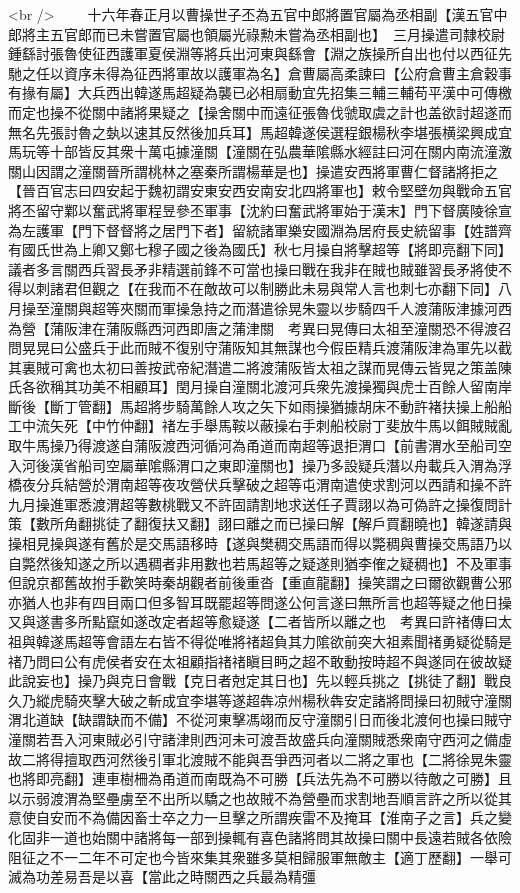 <br />
　　十六年春正月以曹操世子丕為五官中郎將置官屬為丞相副【漢五官中郎將主五官郎而已未嘗置官屬也領屬光祿勲未嘗為丞相副也】　三月操遣司隸校尉鍾繇討張魯使征西護軍夏侯淵等將兵出河東與繇會【淵之族操所自出也付以西征先馳之任以資序未得為征西將軍故以護軍為名】倉曹屬高柔諫曰【公府倉曹主倉穀事有掾有屬】大兵西出韓遂馬超疑為襲已必相扇動宜先招集三輔三輔苟平漢中可傳檄而定也操不從關中諸將果疑之【操舍關中而遠征張魯伐虢取虞之計也盖欲討超遂而無名先張討魯之埶以速其反然後加兵耳】馬超韓遂侯選程銀楊秋李堪張横梁興成宜馬玩等十部皆反其衆十萬屯據潼關【潼關在弘農華隂縣水經註曰河在關内南流潼激關山因謂之潼關晉所謂桃林之塞秦所謂楊華是也】操遣安西將軍曹仁督諸將拒之【晉百官志曰四安起于魏初謂安東安西安南安北四將軍也】敕令堅壁勿與戰命五官將丕留守鄴以奮武將軍程昱參丕軍事【沈約曰奮武將軍始于漢末】門下督廣陵徐宣為左護軍【門下督督將之居門下者】留統諸軍樂安國淵為居府長史統留事【姓譜齊有國氏世為上卿又鄭七穆子國之後為國氏】秋七月操自將擊超等【將即亮翻下同】議者多言關西兵習長矛非精選前鋒不可當也操曰戰在我非在賊也賊雖習長矛將使不得以刺諸君但觀之【在我而不在敵故可以制勝此未易與常人言也刺七亦翻下同】八月操至潼關與超等夾關而軍操急持之而潛遣徐晃朱靈以步騎四千人渡蒲阪津據河西為營【蒲阪津在蒲阪縣西河西即唐之蒲津關　考異曰晃傳曰太祖至潼關恐不得渡召問晃晃曰公盛兵于此而賊不復别守蒲阪知其無謀也今假臣精兵渡蒲阪津為軍先以截其裏賊可禽也太初曰善按武帝紀潛遣二將渡蒲阪皆太祖之謀而晃傳云皆晃之策盖陳氏各欲稱其功美不相顧耳】閏月操自潼關北渡河兵衆先渡操獨與虎士百餘人留南岸斷後【斷丁管翻】馬超將步騎萬餘人攻之矢下如雨操猶據胡床不動許褚扶操上船船工中流矢死【中竹仲翻】禇左手舉馬鞍以蔽操右手刺船校尉丁斐放牛馬以餌賊賊亂取牛馬操乃得渡遂自蒲阪渡西河循河為甬道而南超等退拒渭口【前書渭水至船司空入河後漢省船司空屬華隂縣渭口之東即潼關也】操乃多設疑兵潛以舟載兵入渭為浮橋夜分兵結營於渭南超等夜攻營伏兵擊破之超等屯渭南遣使求割河以西請和操不許九月操進軍悉渡渭超等數桃戰又不許固請割地求送任子賈詡以為可偽許之操復問計策【數所角翻挑徒了翻復扶又翻】詡曰離之而已操曰解【解戶買翻曉也】韓遂請與操相見操與遂有舊於是交馬語移時【遂與樊稠交馬語而得以斃稠與曹操交馬語乃以自斃然後知遂之所以遇稠者非用數也若馬超等之疑遂則猶李傕之疑稠也】不及軍事但說京都舊故拊手歡笑時秦胡觀者前後重沓【重直龍翻】操笑謂之曰爾欲觀曹公邪亦猶人也非有四目兩口但多智耳既罷超等問遂公何言遂曰無所言也超等疑之他日操又與遂書多所點竄如遂改定者超等愈疑遂【二者皆所以離之也　考異曰許禇傳曰太祖與韓遂馬超等會語左右皆不得從唯將禇超負其力隂欲前突大祖素聞禇勇疑從騎是禇乃問曰公有虎侯者安在太祖顧指禇禇瞋目眄之超不敢動按時超不與遂同在彼故疑此說妄也】操乃與克日會戰【克日者尅定其日也】先以輕兵挑之【挑徒了翻】戰良久乃縱虎騎夾擊大破之斬成宜李堪等遂超犇凉州楊秋犇安定諸將問操曰初賊守潼關渭北道缺【缺謂缺而不備】不從河東擊馮翊而反守潼關引日而後北渡何也操曰賊守潼關若吾入河東賊必引守諸津則西河未可渡吾故盛兵向潼關賊悉衆南守西河之備虛故二將得擅取西河然後引軍北渡賊不能與吾爭西河者以二將之軍也【二將徐晃朱靈也將即亮翻】連車樹柵為甬道而南既為不可勝【兵法先為不可勝以待敵之可勝】且以示弱渡渭為堅壘虜至不出所以驕之也故賊不為營壘而求割地吾順言許之所以從其意使自安而不為備因畜士卒之力一旦擊之所謂疾雷不及掩耳【淮南子之言】兵之變化固非一道也始關中諸將每一部到操輒有喜色諸將問其故操曰關中長遠若賊各依險阻征之不一二年不可定也今皆來集其衆雖多莫相歸服軍無敵主【適丁歷翻】一舉可滅為功差易吾是以喜【當此之時關西之兵最為精彊